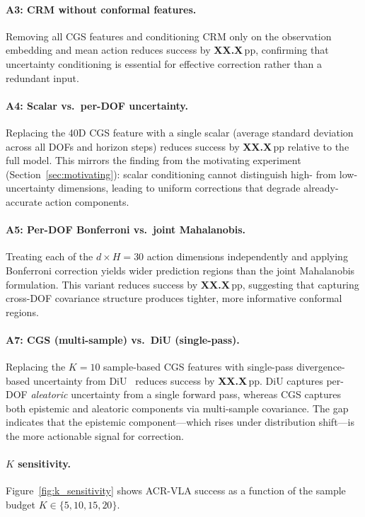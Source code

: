 \paragraph{A3: CRM without conformal features.}
Removing all CGS features and conditioning CRM only on the observation embedding and mean action reduces success by \textbf{XX.X}\,pp, confirming that uncertainty conditioning is essential for effective correction rather than a redundant input.

\paragraph{A4: Scalar vs.\ per-DOF uncertainty.}
Replacing the 40D CGS feature with a single scalar (average standard deviation across all DOFs and horizon steps) reduces success by \textbf{XX.X}\,pp relative to the full model.
This mirrors the finding from the motivating experiment (Section~\ref{sec:motivating}): scalar conditioning cannot distinguish high- from low-uncertainty dimensions, leading to uniform corrections that degrade already-accurate action components.

\paragraph{A5: Per-DOF Bonferroni vs.\ joint Mahalanobis.}
Treating each of the $d{\times}H{=}30$ action dimensions independently and applying Bonferroni correction yields wider prediction regions than the joint Mahalanobis formulation.
This variant reduces success by \textbf{XX.X}\,pp, suggesting that capturing cross-DOF covariance structure produces tighter, more informative conformal regions.

\paragraph{A7: CGS (multi-sample) vs.\ DiU (single-pass).}
Replacing the $K{=}10$ sample-based CGS features with single-pass divergence-based uncertainty from DiU~\cite{xing2026diu} reduces success by \textbf{XX.X}\,pp.
DiU captures per-DOF \emph{aleatoric} uncertainty from a single forward pass, whereas CGS captures both epistemic and aleatoric components via multi-sample covariance.
The gap indicates that the epistemic component---which rises under distribution shift---is the more actionable signal for correction.

\paragraph{$K$ sensitivity.}
Figure~\ref{fig:k_sensitivity} shows ACR-VLA success as a function of the sample budget $K \in \{5, 10, 15, 20\}$.

